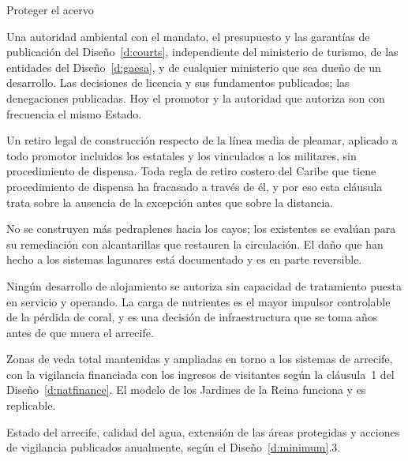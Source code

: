 \begin{design}{Proteger el acervo}
\label{d:protect}
\begin{rules}
 Una autoridad ambiental con el mandato, el presupuesto y las
garantías de publicación del Diseño~\ref{d:courts}, independiente del ministerio de turismo, de
las entidades del Diseño~\ref{d:gaesa}, y de cualquier ministerio que sea dueño de un desarrollo.
Las decisiones de licencia y sus fundamentos publicados; las denegaciones publicadas. Hoy el
promotor y la autoridad que autoriza son con frecuencia el mismo Estado.

 Un retiro legal de construcción respecto de la línea media
de pleamar, aplicado a todo promotor incluidos los estatales y los vinculados a los militares, sin
procedimiento de dispensa. Toda regla de retiro costero del Caribe que tiene procedimiento de
dispensa ha fracasado a través de él, y por eso esta cláusula trata sobre la ausencia de la
excepción antes que sobre la distancia.

 No se construyen más pedraplenes hacia los cayos; los existentes se
evalúan para su remediación con alcantarillas que restauren la circulación. El daño que han hecho
a los sistemas lagunares está documentado y es en parte reversible.

 Ningún desarrollo de alojamiento se autoriza sin
capacidad de tratamiento puesta en servicio y operando. La carga de nutrientes es el mayor
impulsor controlable de la pérdida de coral, y es una decisión de infraestructura que se toma años
antes de que muera el arrecife.

 Zonas de veda total mantenidas y ampliadas en torno a los sistemas de arrecife,
con la vigilancia financiada con los ingresos de visitantes según la cláusula~1 del
Diseño~\ref{d:natfinance}. El modelo de los Jardines de la Reina funciona y es replicable.

 Estado del arrecife, calidad del agua, extensión de las áreas
protegidas y acciones de vigilancia publicados anualmente, según el Diseño~\ref{d:minimum}.3.
\end{rules}
\end{design}


